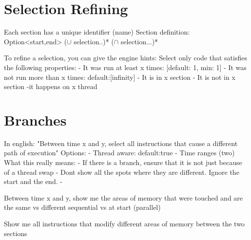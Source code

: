 \maketitle

\section{Selection Refining}

Each section has a unique identifier (name)
Section definition: Option<start,end> ($\cup$ selection..)* ($\cap$ selection...)*

To refine a selection, you can give the engine hints:
Select only code that satisfies the following properties:
- It was run at least x times: [default: 1, min: 1]
- It was not run more than x times: default:[infinity]
- It is in x section 
- It is not in {x} section
-it happens on x thread 


\section{Branches}
In english: "Between time x and y, select all instructions that cause a different path of execution"
Options:
- Thread aware: default:true
- Time ranges (two)
What this really means:
- If there is a branch, ensure that it is not just because of a thread swap
- Dont show all the spots where they are different. Ignore the start and the end. 
- 


Between time x and y, show me the areas of memory that were touched and are the same vs different 
sequential vs at start (parallel)

Show me all instructions that modify different areas of memory between the two sections 




